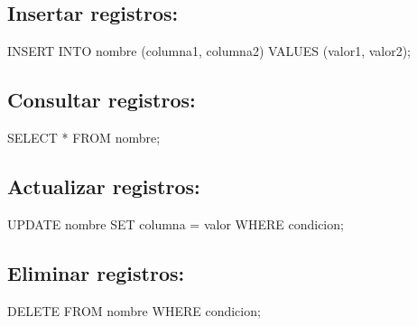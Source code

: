 \documentclass[
  a4paper,
  DIV=11,
  numbers=noendperiod,
  onepage,
  openany]{scrreprt}
\newenvironment{Shaded}{\begin{snugshade}}{\end{snugshade}}
\newcommand{\KeywordTok}[1]{\textcolor[rgb]{0.00,0.23,0.31}{#1}}
\newcommand{\NormalTok}[1]{\textcolor[rgb]{0.00,0.23,0.31}{#1}}
\newcommand{\OperatorTok}[1]{\textcolor[rgb]{0.37,0.37,0.37}{#1}}
\begin{document}
\hypertarget{insertar-registros-3}{%
\subsection{Insertar registros:}\label{insertar-registros-3}}

\begin{Shaded}
\begin{Highlighting}[]
\KeywordTok{INSERT} \KeywordTok{INTO}\NormalTok{ nombre (columna1, columna2) }\KeywordTok{VALUES}\NormalTok{ (valor1, valor2);}
\end{Highlighting}
\end{Shaded}

\hypertarget{consultar-registros-3}{%
\subsection{Consultar registros:}\label{consultar-registros-3}}

\begin{Shaded}
\begin{Highlighting}[]
\KeywordTok{SELECT} \OperatorTok{*} \KeywordTok{FROM}\NormalTok{ nombre;}
\end{Highlighting}
\end{Shaded}

\hypertarget{actualizar-registros-3}{%
\subsection{Actualizar registros:}\label{actualizar-registros-3}}

\begin{Shaded}
\begin{Highlighting}[]
\KeywordTok{UPDATE}\NormalTok{ nombre }\KeywordTok{SET}\NormalTok{ columna }\OperatorTok{=}\NormalTok{ valor }\KeywordTok{WHERE}\NormalTok{ condicion;}
\end{Highlighting}
\end{Shaded}

\hypertarget{eliminar-registros-3}{%
\subsection{Eliminar registros:}\label{eliminar-registros-3}}

\begin{Shaded}
\begin{Highlighting}[]
\KeywordTok{DELETE} \KeywordTok{FROM}\NormalTok{ nombre }\KeywordTok{WHERE}\NormalTok{ condicion;}
\end{Highlighting}
\end{Shaded}
\end{document}
